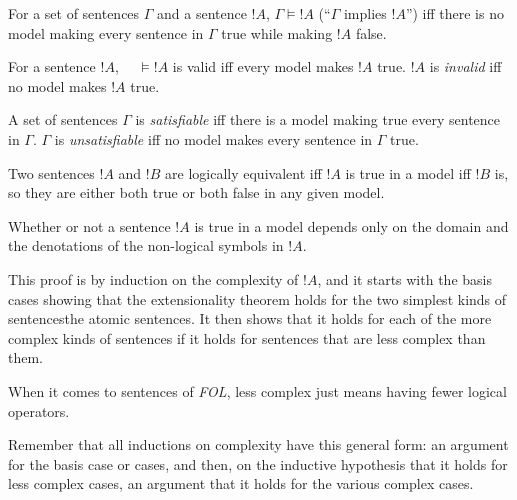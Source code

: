 \documentclass[syntax-and-semantics]{subfiles}
\begin{document}

\begin{defn}[Consequence]
For a set of sentences $\Gamma$ and a sentence $!A$, $\Gamma \vDash !A$ (``$\Gamma$ implies $!A$'') iff there is no model making every sentence in $\Gamma$ true while making $!A$ false.
\end{defn}

\begin{defn}[Validity]
For a sentence $!A$, $\hspace{1em}\vDash !A$ is valid iff every model makes $!A$ true. $!A$ is \emph{invalid} iff no model makes $!A$ true.
\end{defn}

\begin{defn}[Satisfiability]
A set of sentences $\Gamma$ is \emph{satisfiable} iff there is a model making true every sentence in $\Gamma$. $\Gamma$ is \emph{unsatisfiable} iff no model makes every sentence in $\Gamma$ true.
\end{defn}

\begin{defn}
Two sentences $!A$ and $!B$ are logically equivalent iff $!A$ is true in a model iff $!B$ is, so they are either both true or both false in any given model.
\end{defn}



\begin{thm}[Extensionality]
Whether or not a sentence $!A$ is true in a model depends only on the domain and the denotations of the non-logical symbols in $!A$.
\end{thm}
This proof is by induction on the complexity of $!A$, and it starts with the basis cases showing that the extensionality theorem holds for the two simplest kinds of sentences\textemdash the atomic sentences. It then shows that it holds for each of the more complex kinds of sentences if it holds for sentences that are less complex than them.

When it comes to sentences of \emph{FOL}, less complex just means having fewer logical operators.

Remember that all inductions on complexity have this general form: an argument for the basis case or cases, and then, on the inductive hypothesis that it holds for less complex cases, an argument that it holds for the various complex cases.
\end{document}
